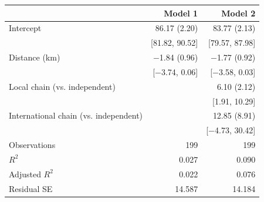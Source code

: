 \begin{tabular}{lrr}
  \toprule
  & Model 1 & Model 2 \\ 
  \midrule
Intercept & 86.17 (2.20) & 83.77 (2.13) \\ 
   & [81.82, 90.52] & [79.57, 87.98] \\ 
  Distance (km) & $-$1.84 (0.96) & $-$1.77 (0.92) \\ 
   & [$-$3.74, 0.06] & [$-$3.58, 0.03] \\ 
  Local chain (vs. independent) &  & 6.10 (2.12) \\ 
   &  & [1.91, 10.29] \\ 
  International chain (vs. independent) &  & 12.85 (8.91) \\ 
   &  & [$-$4.73, 30.42] \\ 
  Observations & 199 & 199 \\ 
  $R^2$ & 0.027 & 0.090 \\ 
  Adjusted $R^2$ & 0.022 & 0.076 \\ 
  Residual SE & 14.587 & 14.184 \\ 
   \bottomrule
\end{tabular}
